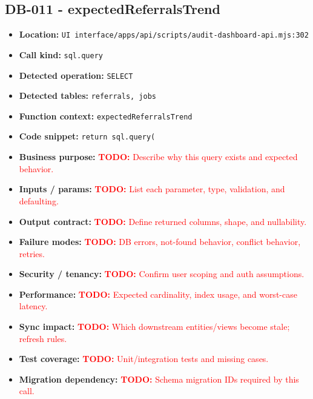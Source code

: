 \documentclass[11pt]{article}
\newcommand{\todoitem}[1]{\textcolor{red}{\textbf{TODO:} #1}}
\begin{document}
\subsection{DB-011 - expectedReferralsTrend}
\begin{itemize}[leftmargin=1.5em]
\item \textbf{Location:} \texttt{UI interface/apps/api/scripts/audit-dashboard-api.mjs:302}
\item \textbf{Call kind:} \texttt{sql.query}
\item \textbf{Detected operation:} \texttt{SELECT}
\item \textbf{Detected tables:} \texttt{referrals, jobs}
\item \textbf{Function context:} \texttt{expectedReferralsTrend}
\item \textbf{Code snippet:} \texttt{return sql.query(}
\item \textbf{Business purpose:} \todoitem{Describe why this query exists and expected behavior.}
\item \textbf{Inputs / params:} \todoitem{List each parameter, type, validation, and defaulting.}
\item \textbf{Output contract:} \todoitem{Define returned columns, shape, and nullability.}
\item \textbf{Failure modes:} \todoitem{DB errors, not-found behavior, conflict behavior, retries.}
\item \textbf{Security / tenancy:} \todoitem{Confirm user scoping and auth assumptions.}
\item \textbf{Performance:} \todoitem{Expected cardinality, index usage, and worst-case latency.}
\item \textbf{Sync impact:} \todoitem{Which downstream entities/views become stale; refresh rules.}
\item \textbf{Test coverage:} \todoitem{Unit/integration tests and missing cases.}
\item \textbf{Migration dependency:} \todoitem{Schema migration IDs required by this call.}
\end{itemize}
\end{document}
